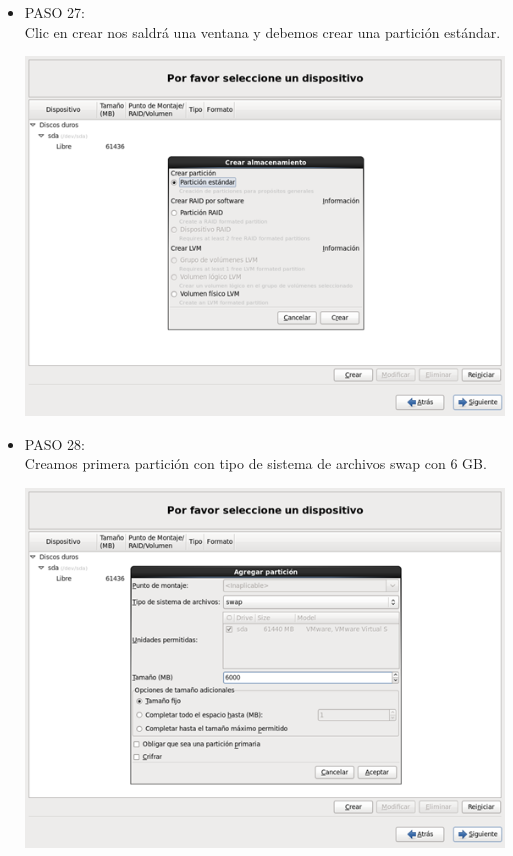 \begin{itemize}
\item PASO 27:
\\Clic en crear  nos saldrá una ventana y debemos crear una partición estándar.
		\begin{center}
		\includegraphics[width=13cm]{./Imagenes/27}
		\end{center}
	
	\end{itemize} 

\begin{itemize}
\item PASO 28:
\\Creamos primera partición  con tipo de sistema de archivos swap con 6 GB.
		\begin{center}
		\includegraphics[width=13cm]{./Imagenes/28}
		\end{center}
	\\\
	\end{itemize} 

